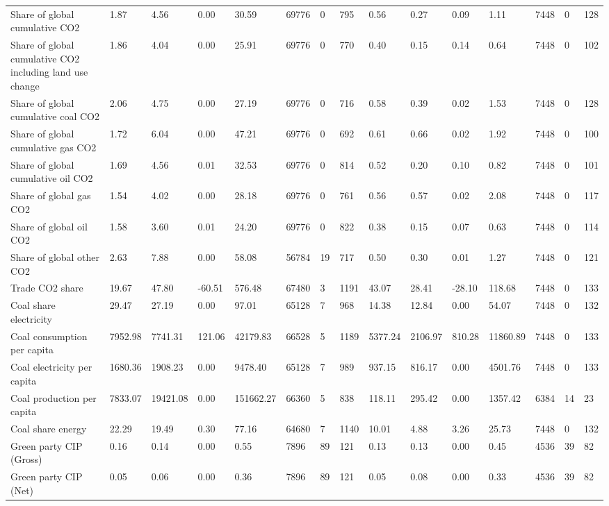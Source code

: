 \begin{longtable}{lllllllllllllll}
\addlinespace
Share of global cumulative CO2 & 1.87 & 4.56 & 0.00 & 30.59 & 69776 & 0 & 795 & 0.56 & 0.27 & 0.09 & 1.11 & 7448 & 0 & 128\\
Share of global cumulative CO2 including land use change & 1.86 & 4.04 & 0.00 & 25.91 & 69776 & 0 & 770 & 0.40 & 0.15 & 0.14 & 0.64 & 7448 & 0 & 102\\
Share of global cumulative coal CO2 & 2.06 & 4.75 & 0.00 & 27.19 & 69776 & 0 & 716 & 0.58 & 0.39 & 0.02 & 1.53 & 7448 & 0 & 128\\
Share of global cumulative gas CO2 & 1.72 & 6.04 & 0.00 & 47.21 & 69776 & 0 & 692 & 0.61 & 0.66 & 0.02 & 1.92 & 7448 & 0 & 100\\
Share of global cumulative oil CO2 & 1.69 & 4.56 & 0.01 & 32.53 & 69776 & 0 & 814 & 0.52 & 0.20 & 0.10 & 0.82 & 7448 & 0 & 101\\
\addlinespace
Share of global gas CO2 & 1.54 & 4.02 & 0.00 & 28.18 & 69776 & 0 & 761 & 0.56 & 0.57 & 0.02 & 2.08 & 7448 & 0 & 117\\
Share of global oil CO2 & 1.58 & 3.60 & 0.01 & 24.20 & 69776 & 0 & 822 & 0.38 & 0.15 & 0.07 & 0.63 & 7448 & 0 & 114\\
Share of global other CO2 & 2.63 & 7.88 & 0.00 & 58.08 & 56784 & 19 & 717 & 0.50 & 0.30 & 0.01 & 1.27 & 7448 & 0 & 121\\
Trade CO2 share & 19.67 & 47.80 & -60.51 & 576.48 & 67480 & 3 & 1191 & 43.07 & 28.41 & -28.10 & 118.68 & 7448 & 0 & 133\\
Coal share electricity & 29.47 & 27.19 & 0.00 & 97.01 & 65128 & 7 & 968 & 14.38 & 12.84 & 0.00 & 54.07 & 7448 & 0 & 132\\
\addlinespace
Coal consumption per capita & 7952.98 & 7741.31 & 121.06 & 42179.83 & 66528 & 5 & 1189 & 5377.24 & 2106.97 & 810.28 & 11860.89 & 7448 & 0 & 133\\
Coal electricity per capita & 1680.36 & 1908.23 & 0.00 & 9478.40 & 65128 & 7 & 989 & 937.15 & 816.17 & 0.00 & 4501.76 & 7448 & 0 & 133\\
Coal production per capita & 7833.07 & 19421.08 & 0.00 & 151662.27 & 66360 & 5 & 838 & 118.11 & 295.42 & 0.00 & 1357.42 & 6384 & 14 & 23\\
Coal share energy & 22.29 & 19.49 & 0.30 & 77.16 & 64680 & 7 & 1140 & 10.01 & 4.88 & 3.26 & 25.73 & 7448 & 0 & 132\\
Green party CIP (Gross) & 0.16 & 0.14 & 0.00 & 0.55 & 7896 & 89 & 121 & 0.13 & 0.13 & 0.00 & 0.45 & 4536 & 39 & 82\\
\addlinespace
Green party CIP (Net) & 0.05 & 0.06 & 0.00 & 0.36 & 7896 & 89 & 121 & 0.05 & 0.08 & 0.00 & 0.33 & 4536 & 39 & 82\\

\end{longtable}
